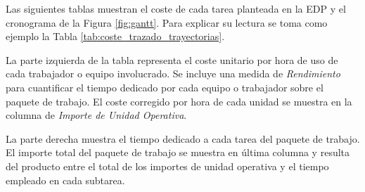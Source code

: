 Las siguientes tablas muestran el coste de cada tarea planteada en la \acrshort{EDP} y el cronograma de la Figura \ref{fig:gantt}. Para explicar su lectura se toma como ejemplo la Tabla \ref{tab:coste_trazado_trayectorias}. 

La parte izquierda de la tabla representa el coste unitario por hora de uso de cada trabajador o equipo involucrado. Se incluye una medida de \textit{Rendimiento} para cuantificar el tiempo dedicado por cada equipo o trabajador sobre el paquete de trabajo. El coste corregido por hora de cada unidad se muestra en la columna de \textit{Importe de Unidad Operativa}. 

La parte derecha muestra el tiempo dedicado a cada tarea del paquete de trabajo. El importe total del paquete de trabajo se muestra en última columna y resulta del producto entre el total de los importes de unidad operativa y el tiempo empleado en cada subtarea.

